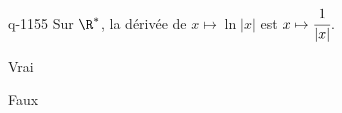 \begin{truefalse}{q-1155}
Sur $\R^*$, la dérivée de $x\mapsto \ln|x|$ est $x\mapsto\cfrac1{|x|}$.
\item Vrai
\item* Faux
\end{truefalse}

